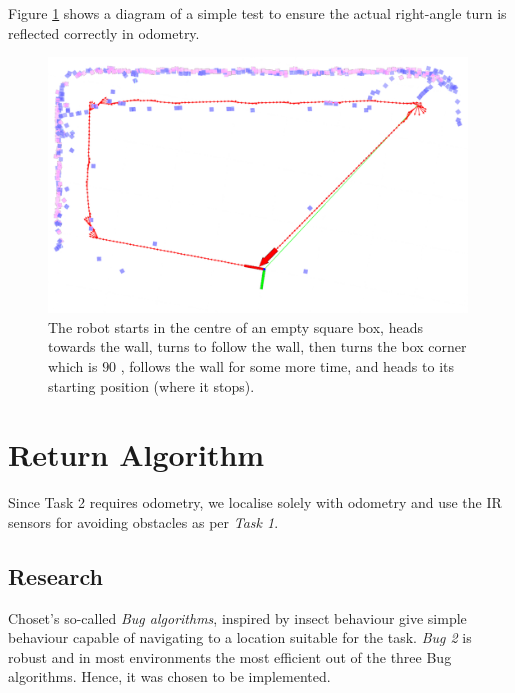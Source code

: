 \documentclass[11pt, a4paper]{article}
\begin{document}
Figure \ref{rightanglecalib} shows a diagram of a simple test to ensure the actual right-angle 
turn is reflected correctly in odometry.

\begin{figure}[H]
  \begin{center}
    \includegraphics[width=30em]{../assets/right-angle-calibration.png}
    \caption{\label{rightanglecalib}The robot starts in the centre of an empty square box, heads towards the wall, turns to follow the wall, then turns the box corner which is $90$ \degree, follows the wall for some more time, and heads to its starting position (where it stops).}
  \end{center}
\end{figure} 





\section{Return Algorithm}
\label{Return Algorithm}

Since Task 2 requires odometry, we localise solely with odometry and use the IR sensors for 
avoiding obstacles as per \textit{Task 1}\cite{task1_report}.


\subsection{Research}

Choset's so-called \textit{Bug algorithms}\cite{principlesrobot}, inspired by insect behaviour
give simple behaviour capable of navigating to a location suitable for the task. \textit{Bug 2} is
robust and in most environments the most efficient out of the three Bug algorithms. 
Hence, it was chosen to be implemented.
\end{document}
